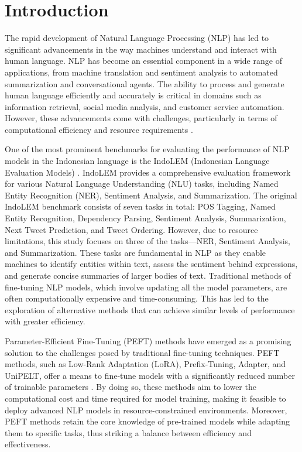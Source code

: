 \section{Introduction}

The rapid development of Natural Language Processing (NLP) has led to significant advancements in the way machines understand and interact with human language. NLP has become an essential component in a wide range of applications, from machine translation and sentiment analysis to automated summarization and conversational agents. The ability to process and generate human language efficiently and accurately is critical in domains such as information retrieval, social media analysis, and customer service automation. However, these advancements come with challenges, particularly in terms of computational efficiency and resource requirements \cite{nlp, ai}.

One of the most prominent benchmarks for evaluating the performance of NLP models in the Indonesian language is the IndoLEM (Indonesian Language Evaluation Models) \cite{indolem}. IndoLEM provides a comprehensive evaluation framework for various Natural Language Understanding (NLU) tasks, including Named Entity Recognition (NER), Sentiment Analysis, and Summarization. The original IndoLEM benchmark consists of seven tasks in total: POS Tagging, Named Entity Recognition, Dependency Parsing, Sentiment Analysis, Summarization, Next Tweet Prediction, and Tweet Ordering. However, due to resource limitations, this study focuses on three of the tasks—NER, Sentiment Analysis, and Summarization. These tasks are fundamental in NLP as they enable machines to identify entities within text, assess the sentiment behind expressions, and generate concise summaries of larger bodies of text. Traditional methods of fine-tuning NLP models, which involve updating all the model parameters, are often computationally expensive and time-consuming. This has led to the exploration of alternative methods that can achieve similar levels of performance with greater efficiency.

Parameter-Efficient Fine-Tuning (PEFT) methods have emerged as a promising solution to the challenges posed by traditional fine-tuning techniques. PEFT methods, such as Low-Rank Adaptation (LoRA), Prefix-Tuning, Adapter, and UniPELT, offer a means to fine-tune models with a significantly reduced number of trainable parameters \cite{adapter_houlsby, prefix_tuning, lora, unipelt}. By doing so, these methods aim to lower the computational cost and time required for model training, making it feasible to deploy advanced NLP models in resource-constrained environments. Moreover, PEFT methods retain the core knowledge of pre-trained models while adapting them to specific tasks, thus striking a balance between efficiency and effectiveness.

